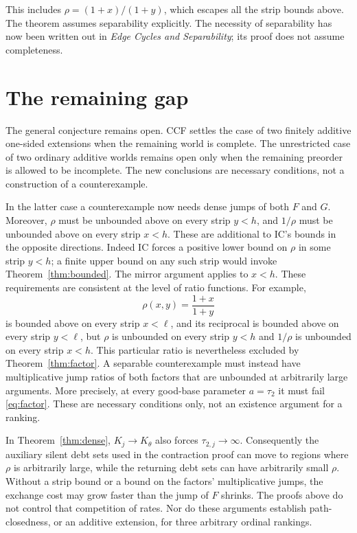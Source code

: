 \documentclass[11pt]{article}
\theoremstyle{remark}\newtheorem{remark}[theorem]{Remark}
\begin{document}
This includes $\rho=(1+x)/(1+y)$, which escapes all the strip bounds above.
The theorem assumes separability explicitly. The necessity of separability
has now been written out in \emph{Edge Cycles and Separability}; its proof
does not assume completeness.

\section{The remaining gap}

The general conjecture remains open. CCF settles the case of two finitely
additive one-sided extensions when the remaining world is complete. The
unrestricted case of two ordinary additive worlds remains open only when
the remaining preorder is allowed to be incomplete. The new conclusions are necessary conditions,
not a construction of a counterexample.

In the latter case a counterexample now needs dense jumps of both $F$ and
$G$. Moreover, $\rho$ must be unbounded above on every strip $y<h$,
and $1/\rho$ must be unbounded above on every strip $x<h$. These are
additional to IC's bounds in the opposite directions. Indeed IC forces a
positive lower bound on $\rho$ in some strip $y<h$; a finite upper bound
on any such strip would invoke Theorem~\ref{thm:bounded}. The mirror
argument applies to $x<h$. These requirements are consistent at the level
of ratio functions. For example,
\[
 \rho(x,y)=\frac{1+x}{1+y}
\]
is bounded above on every strip $x<\ell$, and its reciprocal is bounded
above on every strip $y<\ell$, but $\rho$ is unbounded on every strip $y<h$ and $1/\rho$ is unbounded
on every strip $x<h$. This particular ratio is nevertheless excluded by
Theorem~\ref{thm:factor}. A separable counterexample must instead have
multiplicative jump ratios of both factors that are unbounded at
arbitrarily large arguments. More precisely, at every good-base parameter $a=\tau_2$ it must
fail \eqref{eq:factor}. These are necessary conditions only, not an
existence argument for a ranking.

In Theorem~\ref{thm:dense}, $K_j\to K_\theta$ also forces
$\tau_{2,j}\to\infty$. Consequently the auxiliary silent debt sets used
in the contraction proof can move to regions where $\rho$ is arbitrarily
large, while the returning debt sets can have arbitrarily small $\rho$.
Without a strip bound or a bound on the factors' multiplicative jumps, the
exchange cost may grow faster than the jump of $F$ shrinks. The proofs
above do not control that competition of rates.
Nor do these arguments establish path-closedness, or an additive extension, for three
arbitrary ordinal rankings.
\end{document}
